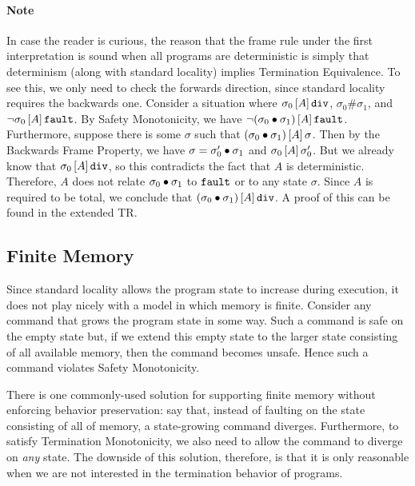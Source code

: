 \ifextended
\paragraph{Note}
\fi
In case the reader is curious, the reason that the frame rule under the first interpretation is sound when
all programs are deterministic is simply that determinism (along with standard locality) implies Termination
Equivalence. 
\ifextended
To see this, we only need to check the forwards direction, since standard locality requires the
backwards one. Consider a situation where $\relatebr{A}{\sigma_0}{\dvg}$, $\sigma_0 \# \sigma_1$, and
$\lnot \relatebr{A}{\sigma_0}{\fault}$. By Safety Monotonicity, we have 
$\lnot \relatebr{A}{(\sigma_0 \dt \sigma_1)}{\fault}$. Furthermore, suppose there is some $\sigma$
such that $\relatebr{A}{(\sigma_0 \dt \sigma_1)}{\sigma}$. Then by the Backwards Frame Property, we
have $\sigma = \sigma_0' \dt \sigma_1$ and $\relatebr{A}{\sigma_0}{\sigma_0'}$. But we already know
that $\relatebr{A}{\sigma_0}{\dvg}$, so this contradicts the fact that $A$ is deterministic. Therefore,
$A$ does not relate $\sigma_0 \dt \sigma_1$ to $\fault$ or to any state $\sigma$. Since $A$ is
required to be total, we conclude that  $\relatebr{A}{(\sigma_0 \dt \sigma_1)}{\dvg}$.
\else
A proof of this can be found in the extended TR.
\fi


\subsection{Finite Memory}
\label{ssec:finitemem}

Since standard locality allows the program state to increase during
execution, it does not play nicely with a model in which memory is
finite. Consider any command that grows the program state 
in some way. Such a command is safe on the empty state but, if we extend this empty
state to the larger state consisting of all available memory, then
the command becomes unsafe. Hence such a command violates Safety
Monotonicity.

There is one commonly-used solution for supporting finite memory without 
enforcing behavior preservation: say that, instead of faulting on the state
consisting of all of memory, a state-growing command diverges. Furthermore, to
satisfy Termination Monotonicity, we also need to allow the command to
diverge on \emph{any} state. The downside of this solution, therefore,
is that it is only reasonable when we are not interested in the
termination behavior of programs.

